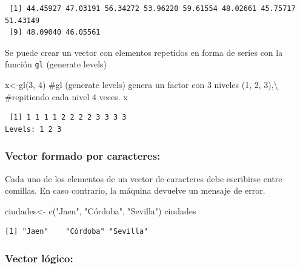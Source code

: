 \documentclass[
  letterpaper,
  DIV=11,
  numbers=noendperiod]{scrreprt}
\newenvironment{Shaded}{\begin{snugshade}}{\end{snugshade}}
\newcommand{\CommentTok}[1]{\textcolor[rgb]{0.37,0.37,0.37}{#1}}
\newcommand{\DecValTok}[1]{\textcolor[rgb]{0.68,0.00,0.00}{#1}}
\newcommand{\FunctionTok}[1]{\textcolor[rgb]{0.28,0.35,0.67}{#1}}
\newcommand{\NormalTok}[1]{\textcolor[rgb]{0.00,0.23,0.31}{#1}}
\newcommand{\OtherTok}[1]{\textcolor[rgb]{0.00,0.23,0.31}{#1}}
\newcommand{\StringTok}[1]{\textcolor[rgb]{0.13,0.47,0.30}{#1}}
\begin{document}
\begin{verbatim}
 [1] 44.45927 47.03191 56.34272 53.96220 59.61554 48.02661 45.75717 51.43149
 [9] 48.09040 46.05561
\end{verbatim}

Se puede crear un vector con elementos repetidos en forma de series con
la función \texttt{gl} (generate levels)

\begin{Shaded}
\begin{Highlighting}[]
\NormalTok{x}\OtherTok{\textless{}{-}}\FunctionTok{gl}\NormalTok{(}\DecValTok{3}\NormalTok{, }\DecValTok{4}\NormalTok{) }\CommentTok{\#gl (generate levels) genera un factor con 3 niveles (1, 2, 3),\textbackslash{}}
\CommentTok{\#repitiendo cada nivel 4 veces. }
\NormalTok{x }
\end{Highlighting}
\end{Shaded}

\begin{verbatim}
 [1] 1 1 1 1 2 2 2 2 3 3 3 3
Levels: 1 2 3
\end{verbatim}

\hypertarget{vector-formado-por-caracteres}{%
\subsubsection{Vector formado por
caracteres:}\label{vector-formado-por-caracteres}}

Cada uno de los elementos de un vector de caracteres debe escribirse
entre comillas. En caso contrario, la máquina devuelve un mensaje de
error.

\begin{Shaded}
\begin{Highlighting}[]
\NormalTok{ciudades}\OtherTok{\textless{}{-}} \FunctionTok{c}\NormalTok{(}\StringTok{"Jaen"}\NormalTok{, }\StringTok{"Córdoba"}\NormalTok{, }\StringTok{"Sevilla"}\NormalTok{)}
\NormalTok{ciudades}
\end{Highlighting}
\end{Shaded}

\begin{verbatim}
[1] "Jaen"    "Córdoba" "Sevilla"
\end{verbatim}

\hypertarget{vector-luxf3gico}{%
\subsubsection{Vector lógico:}\label{vector-luxf3gico}}
\end{document}
